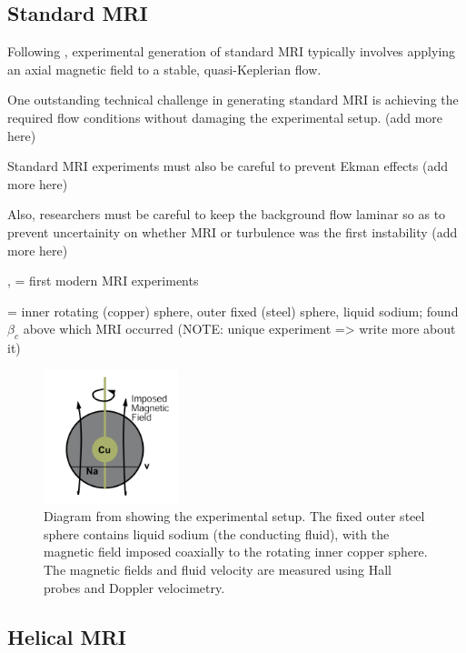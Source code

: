 \documentclass{jfm}
\begin{document}
%
%
\subsection{Standard MRI}
\label{sec:standard_mri}
Following \cite{Ji2001}, experimental generation of standard MRI typically 
involves applying an axial magnetic field to a stable, quasi-Keplerian flow.

One outstanding technical challenge in generating standard MRI is achieving the
required flow conditions without damaging the experimental setup. (add more here)

Standard MRI experiments must also be careful to prevent Ekman effects (add more here)

Also, researchers must be careful to keep the background flow laminar so as to
prevent uncertainity on whether MRI or turbulence was the first instability (add more here)


\cite{Ji2001}, \cite{Ji2002} = first modern MRI experiments

\cite{Sisan2004} = inner rotating (copper) sphere, outer fixed (steel) sphere, 
liquid sodium; found $\beta_c$ above which MRI occurred (NOTE: unique experiment => write more about it)

\begin{figure}[t]
    \centering
    \includegraphics[width=0.35\textwidth]{Sisan2004_diagram}
    \caption{Diagram from \cite{Sisan2004} showing the experimental setup. The fixed outer steel sphere contains liquid sodium (the conducting fluid), with the magnetic field imposed coaxially to the rotating inner copper sphere. The magnetic fields and fluid velocity are measured using Hall probes and Doppler velocimetry.}
\end{figure}




%
%
\subsection{Helical MRI}
\end{document}
